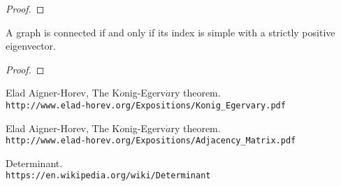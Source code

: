 \documentclass[a4paper, 11pt, oneside]{article}
\newenvironment{problem}[1]
  {\renewcommand\theinnercustomprob{#1}\innercustomprob}
  {\endinnercustomprob}
\begin{document}
\begin{proof}

\end{proof}

\begin{problem}{3.5}\label{problem3.5}
A graph is connected if and only if its index is simple with a strictly positive eigenvector.
\end{problem}

\begin{proof}

\end{proof}

\begin{thebibliography}{9} 
Elad Aigner-Horev,
The K$\ddot{o}$nig-Egerv$\acute{a}$ry theorem.
\\\texttt{http://www.elad-horev.org/Expositions/Konig\_Egervary.pdf}

Elad Aigner-Horev,
The K$\ddot{o}$nig-Egerv$\acute{a}$ry theorem.
\\\texttt{http://www.elad-horev.org/Expositions/Adjacency\_Matrix.pdf}

Determinant.
\\\texttt{https://en.wikipedia.org/wiki/Determinant}

\end{thebibliography}
\end{document}
